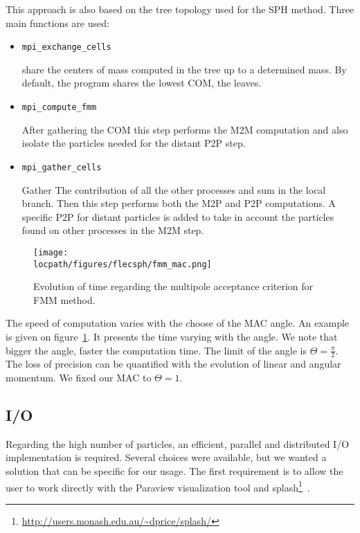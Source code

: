 This approach is also based on the tree topology used for the SPH method. 
Three main functions are used: 
\begin{itemize}
	\item \begin{verbatim}mpi_exchange_cells\end{verbatim} share the centers of mass computed in the tree up to a determined mass. By default, the program shares the lowest COM, the leaves. 
	\item \begin{verbatim}mpi_compute_fmm\end{verbatim} After gathering the COM this step performs the M2M computation and also isolate the particles needed for the distant P2P step. 
	\item \begin{verbatim}mpi_gather_cells\end{verbatim} Gather The contribution of all the other processes and sum in the local branch.
	Then this step performs both the M2P and P2P computations. 
	A specific P2P for distant particles is added to take in account the particles found on other processes in the M2M step.
\end{itemize}

\begin{figure}[t!]
\centering
\texttt{[image: \\locpath/figures/flecsph/fmm\_mac.png]}
\caption{Evolution of time regarding the multipole acceptance criterion for FMM method.}
\label{fig:mac_angle}
\end{figure}

The speed of computation varies with the choose of the MAC angle. 
An example is given on figure~\ref{fig:mac_angle}.
It presents the time varying with the angle. 
We note that bigger the angle, faster the computation time. 
The limit of the angle is $\Theta =  \frac{\pi}{2}$.
The loss of precision can be quantified with the evolution of linear and angular momentum.
We fixed our MAC to $\Theta = 1$.

\subsection{I/O}
Regarding the high number of particles, an efficient, parallel and distributed I/O implementation is required. 
Several choices were available, but we wanted a solution that can be specific for our usage. 
The first requirement is to allow the user to work directly with the Paraview visualization tool and splash\footnote{\url{http://users.monash.edu.au/~dprice/splash/}}~\cite{price2007splash}.

